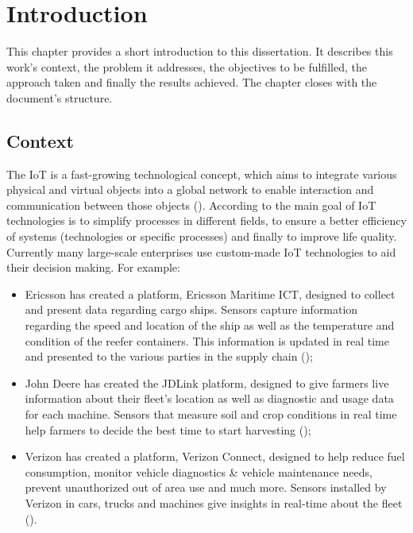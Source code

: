 \chapter{Introduction}
\label{chap:introduction}

This chapter provides a short introduction to this dissertation. It describes this work's context, the problem it addresses, the objectives to be fulfilled, the approach taken and finally the results achieved. The chapter closes with the document's structure. 

\section{Context}
\label{sec:introduction:context}

The \gls{IoT} is a fast-growing technological concept, which aims to integrate various physical and virtual objects into a global network to enable interaction and communication between those objects (\cite{Atzori2010TheIO}). According to \cite{NIZETIC2020122877} the main goal of \gls{IoT} technologies is to simplify processes in different fields, to ensure a better efficiency of systems (technologies or specific processes) and finally to improve life quality. 
Currently many large-scale enterprises use custom-made \gls{IoT} technologies to aid their decision making. For example:
\begin{itemize}
    \item Ericsson has created a platform, Ericsson Maritime ICT, designed to collect and present data regarding cargo ships. Sensors capture information regarding the speed and location of the ship as well as the temperature and condition of the reefer containers. This information is updated in real time and presented to the various parties in the supply chain (\cite{ericson-marinetime});
    \item John Deere has created the JDLink platform, designed to give farmers live information about their fleet's location as well as diagnostic and usage data for each machine. Sensors that measure soil and crop conditions in real time help farmers to decide the best time to start harvesting (\cite{jdlink});
    \item Verizon has created a platform, Verizon Connect, designed to help reduce fuel consumption, monitor vehicle diagnostics \& vehicle maintenance needs, prevent unauthorized out of area use and much more. Sensors installed by Verizon in cars, trucks and machines give insights in real-time about the fleet (\cite{verizon-iot}).   
\end{itemize}

